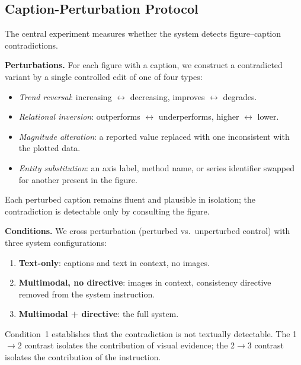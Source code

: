 \documentclass[conference]{IEEEtran}
\newif\ifdraftmode
\newcommand{\TODO}[1]{\ifdraftmode\textcolor{red}{\textbf{[TODO: #1]}}\fi}
\begin{document}
\subsection{Caption-Perturbation Protocol}
The central experiment measures whether the system detects figure--caption
contradictions.

\textbf{Perturbations.} For each figure with a caption, we construct a
contradicted variant by a single controlled edit of one of four types:
\begin{itemize}
  \item \emph{Trend reversal}: increasing $\leftrightarrow$ decreasing,
  improves $\leftrightarrow$ degrades.
  \item \emph{Relational inversion}: outperforms $\leftrightarrow$
  underperforms, higher $\leftrightarrow$ lower.
  \item \emph{Magnitude alteration}: a reported value replaced with one
  inconsistent with the plotted data.
  \item \emph{Entity substitution}: an axis label, method name, or series
  identifier swapped for another present in the figure.
\end{itemize}
Each perturbed caption remains fluent and plausible in isolation; the
contradiction is detectable only by consulting the figure.
\TODO{Perturbations must be human-verified as (a) genuinely contradictory and
(b) undetectable from text alone. Report inter-annotator agreement on a
sample. A reviewer will assume the perturbations leak textual cues unless you
show otherwise.}

\textbf{Conditions.} We cross perturbation (perturbed vs.\ unperturbed
control) with three system configurations:
\begin{enumerate}
  \item \textbf{Text-only}: captions and text in context, no images.
  \item \textbf{Multimodal, no directive}: images in context, consistency
  directive removed from the system instruction.
  \item \textbf{Multimodal + directive}: the full system.
\end{enumerate}
Condition~1 establishes that the contradiction is not textually detectable.
The 1$\rightarrow$2 contrast isolates the contribution of visual evidence; the
2$\rightarrow$3 contrast isolates the contribution of the instruction.
\end{document}
